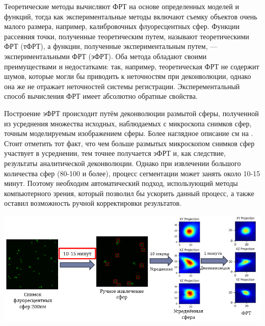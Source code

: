 \par Теоретические методы вычисляют ФРТ на основе определенных моделей и функций, тогда как экспериментальные методы включают съемку объектов очень малого размера, например, калибровочных флуоресцентных сфер. Функции рассеяния точки, полученные теоретическим путем, называют теоретическими ФРТ (тФРТ), а функции, полученные экспериментальным путем, — экспериментальными ФРТ (эФРТ). Оба метода обладают своими преимуществами и недостатками: так, например, теоретическая ФРТ не содержит шумов, которые могли бы приводить к неточностям при деконволюции, однако она же не отражает неточностей системы регистрации. Эксперементальный способ вычисления ФРТ имеет абсолютно обратные свойства.

\par Построение эФРТ происходит путём деконволюции размытой сферы, полученной из усреднения множества исходных, наблюдаемых с микроскопа снимков сфер, точным моделируемым изображением сферы. Более наглядное описание см на . Стоит отметить тот факт, что чем больше размытых микроскопом снимков сфер участвует в усреднении, тем точнее получается эФРТ и, как следствие, результаты  аналитической деконволюции. Однако при извлечении большого количества сфер (80-100 и более), процесс сегментации может занять около 10-15 минут. Поэтому необходим автоматический подход, использующий методы компьютерного зрения, который позволил бы ускорить данный процесс, а также оставил возможность ручной корректировки результатов.
\begin{minipage}{\textwidth}
	\centering
	\vspace{\mfloatsep} %
	\includegraphics[keepaspectratio=true,scale=0.85] {my_folder/images/problem/segment_spheres.png}
	\label{fig:autosegm-problem}  
	\vspace{\mfloatsep} %
\end{minipage}

